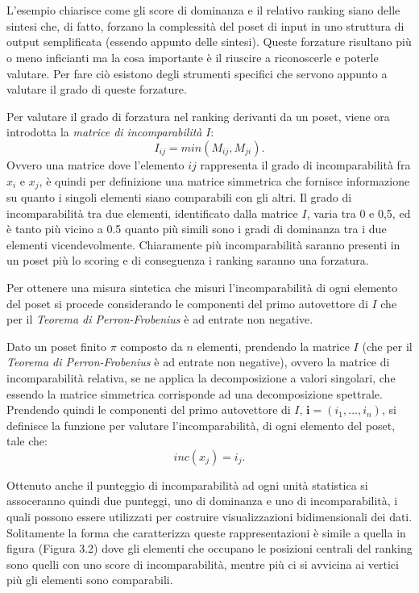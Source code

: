 \documentclass{report}
\begin{document}
\\~\\
L'esempio chiarisce come gli score di dominanza e il relativo ranking siano delle sintesi che, di fatto, forzano la complessità del poset di input in uno struttura di output semplificata (essendo appunto delle sintesi). Queste forzature risultano più o meno inficianti ma la cosa importante è il riuscire a riconoscerle e poterle valutare.
Per fare ciò esistono degli strumenti specifici che servono appunto a valutare il grado di queste forzature.


Per valutare il grado di forzatura nel ranking derivanti da un poset, viene ora introdotta la \textit{matrice di incomparabilità} $I$:
\[I_{ij}=min(M_{ij},M_{ji}).\]
Ovvero una matrice dove l'elemento $ij$ rappresenta il grado di incomparabilità fra $x_i$ e $x_j$, è quindi per definizione una matrice simmetrica che fornisce informazione su quanto i singoli elementi siano comparabili con gli altri.
Il grado di incomparabilità tra due elementi, identificato dalla matrice $I$, varia tra 0 e 0,5, ed è tanto più vicino a 0.5 quanto più simili sono i gradi di dominanza tra i due elementi vicendevolmente. Chiaramente più incomparabilità saranno presenti in un poset più lo scoring e di conseguenza i ranking saranno una forzatura. 


Per ottenere una misura sintetica che misuri l'incomparabilità di ogni elemento del poset si procede considerando le componenti del primo autovettore di $I$ che per il \textit{Teorema di Perron-Frobenius} è ad entrate non negative. 

\begin{definition}
Dato un poset finito $\pi$ composto da $n$ elementi, prendendo la matrice $I$ (che per il \textit{Teorema di Perron-Frobenius} è ad entrate non negative), ovvero la matrice di incomparabilità relativa, se ne applica la decomposizione a valori singolari, che essendo la matrice simmetrica corrisponde ad una decomposizione spettrale.
Prendendo quindi le componenti del primo autovettore di $I$, $ \textbf{i} = (i_1, ...,i_n)$, si definisce la funzione per valutare l'incomparabilità, di ogni elemento del poset, tale che: 
\[inc(x_j) = i_j.\]
\end{definition}

Ottenuto anche il punteggio di incomparabilità ad ogni unità statistica si assoceranno quindi due punteggi, uno di dominanza e uno di incomparabilità, i quali possono essere utilizzati per costruire visualizzazioni bidimensionali dei dati. 
Solitamente la forma che caratterizza queste rappresentazioni è simile a quella in figura (Figura 3.2) dove gli elementi che occupano le posizioni centrali del ranking sono quelli con uno score di incomparabilità, mentre più ci si avvicina ai vertici più gli elementi sono comparabili.
\end{document}
